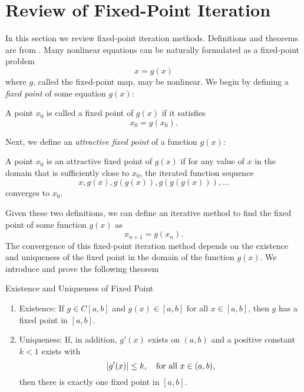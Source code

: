 \section{Review of Fixed-Point Iteration}
\label{sec:FPI}

In this section we review fixed-point iteration methods. Definitions and theorems are from \cite{ortega_numerical_1990}. Many nonlinear equations can be naturally formulated as a fixed-point problem
\begin{equation}
	x = g(x)
\end{equation}
where $g$, called the fixed-point map, may be nonlinear. We begin by defining a \textit{fixed point} of some equation $g(x)$:
\begin{definition}
A point $x_{0}$ is called a fixed point of $g(x)$ if it satisfies
\begin{equation}
	x_{0} = g(x_{0}).
\end{equation}
\end{definition}
Next, we define an \textit{attractive fixed point} of a function $g(x)$:
\begin{definition}
A point $x_{0}$ is an attractive fixed point of $g(x)$ if for any value of $x$ in the domain that is sufficiently close to $x_{0}$, the iterated function sequence
\begin{equation}
	x, g(x), g(g(x)), g(g(g(x))), \dots
\end{equation}
converges to $x_{0}$.
\end{definition}
Given these two definitions, we can define an iterative method to find the fixed point of some function $g(x)$ as
\begin{equation}
x_{n+1} = g(x_{n}).
\end{equation}
The convergence of this fixed-point iteration method depends on the existence and uniqueness of the fixed point in the domain of the function $g(x)$. We introduce and prove the following theorem
\begin{theorem}{Existence and Uniqueness of Fixed Point}
	\begin{enumerate}
		\item Existence: If $g \in C[a,b]$ and $g(x) \in [a,b]$ for all $x \in [a,b]$, then $g$ has a fixed point in $[a,b]$.
		\item Uniqueness: If, in addition, $g'(x)$ exists on $(a,b)$ and a positive constant $k < 1$ exists with
			\begin{equation*}
				\lvert g'(x)\rvert \leq k, \quad \text{for all } x \in (a,b),
			\end{equation*}
			then there is exactly one fixed point in $[a,b]$.
	\end{enumerate}
\end{theorem}


